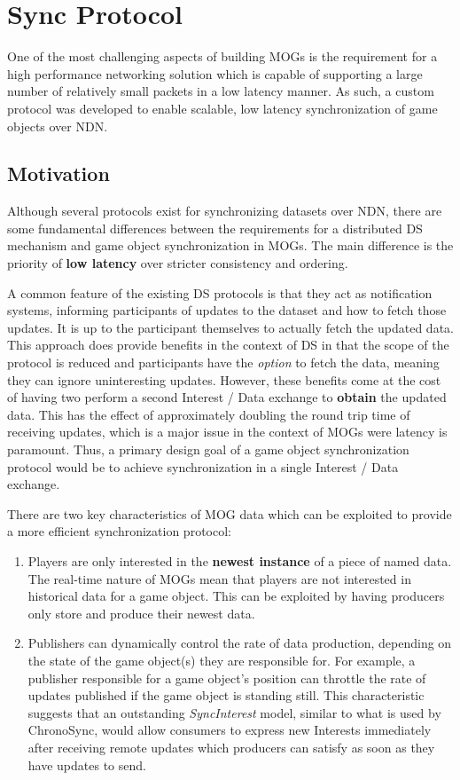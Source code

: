 \section{\game{} Sync Protocol}\label{sec:des:sync-protocol}
One of the most challenging aspects of building MOGs is the requirement for a high performance networking solution which is capable of supporting a large number of relatively small packets in a low latency manner. As such, a custom protocol was developed to enable scalable, low latency synchronization of game objects over NDN.

\subsection{Motivation}
Although several protocols exist for synchronizing datasets over NDN, there are some fundamental differences between the requirements for a distributed DS mechanism and game object synchronization in MOGs. The main difference is the priority of \textbf{low latency} over stricter consistency and ordering.

A common feature of the existing DS protocols is that they act as notification systems, informing participants of updates to the dataset and how to fetch those updates. It is up to the participant themselves to actually fetch the updated data. This approach does provide benefits in the context of DS in that the scope of the protocol is reduced and participants have the \textit{option} to fetch the data, meaning they can ignore uninteresting updates. However, these benefits come at the cost of having two perform a second Interest / Data exchange to \textbf{obtain} the updated data. This has the effect of approximately doubling the round trip time of receiving updates, which is a major issue in the context of MOGs were latency is paramount. Thus, a primary design goal of a game object synchronization protocol would be to achieve synchronization in a single Interest / Data exchange.

There are two key characteristics of MOG data which can be exploited to provide a more efficient synchronization protocol:
\begin{enumerate}
    \item Players are only interested in the \textbf{newest instance} of a piece of named data. The real-time nature of MOGs mean that players are not interested in historical data for a game object. This can be exploited by having producers only store and produce their newest data.
    \item Publishers can dynamically control the rate of data production, depending on the state of the game object(s) they are responsible for. For example, a publisher responsible for a game object's position can throttle the rate of updates published if the game object is standing still. This characteristic suggests that an outstanding \textit{SyncInterest} model, similar to what is used by ChronoSync, would allow consumers to express new Interests immediately after receiving remote updates which producers can satisfy as soon as they have updates to send.
\end{enumerate}

